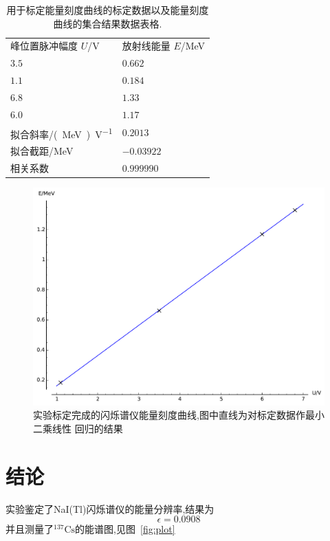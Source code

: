 \documentclass[aps,pre,12pt,preprint,onecolumn,showpacs,showkeys]{revtex4-1}
\begin{document}
\begin{table}[htbp]
  \caption{\label{tab:cali}%
    用于标定能量刻度曲线的标定数据以及能量刻度曲线的集合结果数据表格.}
\begin{ruledtabular}
  \begin{tabular}{ll}
峰位置脉冲幅度 $U$/\si{V} & 放射线能量 $E$/\si{MeV} \\
\colrule
$3.5$ & $0.662$ \\
$1.1$ & $0.184$ \\
$6.8$ & $1.33$ \\
$6.0$ & $1.17$ \\ \colrule
拟合斜率/\si{(MeV)V^{-1}} & $0.2013$ \\
拟合截距/\si{MeV} & $-0.03922$ \\
相关系数 & $0.999990$
\end{tabular}
\end{ruledtabular}
\end{table}

\begin{figure}[htbp]
  \centering
\includegraphics[width=\textwidth]{plot2.pdf}
\caption{\label{fig:cali}%
实验标定完成的闪烁谱仪能量刻度曲线,图中直线为对标定数据作最小二乘线性
回归的结果}
\end{figure}

\section{结论}
 
实验鉴定了NaI(Tl)闪烁谱仪的能量分辨率,结果为
\begin{equation}
  \epsilon = 0.0908
\end{equation}
并且测量了$^{137}\text{Cs}$的能谱图,见图~\ref{fig:plot}
\end{document}
